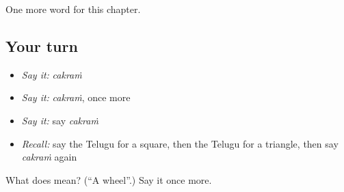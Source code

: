 \begin{grammarlens}[title={What you've built}]
One more word for this chapter.
\end{grammarlens}

\subsection*{Your turn}
\begin{itemize}
\raggedright
  \item \emph{Say it:} \emph{cakraṁ}
  \item \emph{Say it:} \emph{cakraṁ}, once more
  \item \emph{Say it:} say \emph{cakraṁ}
  \item \emph{Recall:} say the Telugu for a square, then the Telugu for a triangle, then say \emph{cakraṁ} again
\end{itemize}

\begin{tcolorbox}[breakable,colback=teal!4,colframe=teal!35!black,title={Before you move on}]
What does  mean? (\textquotedblleft{}A wheel\textquotedblright{}.) Say it once more.
\end{tcolorbox}

